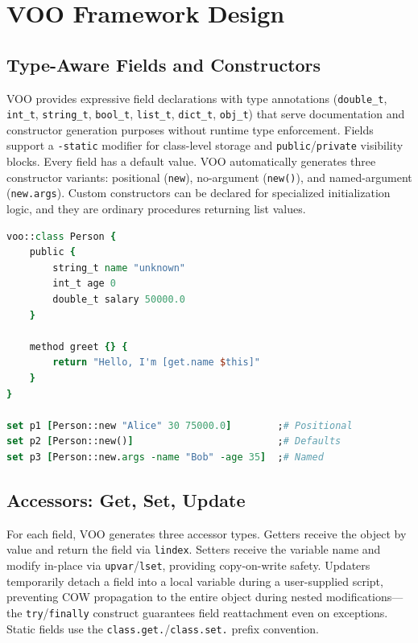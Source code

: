 \section{VOO Framework Design}

\subsection{Type-Aware Fields and Constructors}

VOO provides expressive field declarations with type annotations (\texttt{double\_t},
\texttt{int\_t}, \texttt{string\_t}, \texttt{bool\_t}, \texttt{list\_t}, \texttt{dict\_t},
\texttt{obj\_t}) that serve documentation and constructor generation purposes without
runtime type enforcement. Fields support a \texttt{-static} modifier for class-level
storage and \texttt{public}/\texttt{private} visibility blocks. Every field has a default
value. VOO automatically generates three constructor variants: positional (\texttt{new}),
no-argument (\texttt{new()}), and named-argument (\texttt{new.args}). Custom constructors
can be declared for specialized initialization logic, and they are ordinary procedures
returning list values.

\begin{lstlisting}[language=Tcl, caption={VOO class declaration with multiple constructor variants}]
voo::class Person {
    public {
        string_t name "unknown"
        int_t age 0
        double_t salary 50000.0
    }

    method greet {} {
        return "Hello, I'm [get.name $this]"
    }
}

set p1 [Person::new "Alice" 30 75000.0]        ;# Positional
set p2 [Person::new()]                         ;# Defaults
set p3 [Person::new.args -name "Bob" -age 35]  ;# Named
\end{lstlisting}

\subsection{Accessors: Get, Set, Update}

For each field, VOO generates three accessor types. Getters receive the object by value
and return the field via \texttt{lindex}. Setters receive the variable name and modify
in-place via \texttt{upvar}/\texttt{lset}, providing copy-on-write safety. Updaters
temporarily detach a field into a local variable during a user-supplied script, preventing
COW propagation to the entire object during nested modifications---the
\texttt{try}/\texttt{finally} construct guarantees field reattachment even on exceptions.
Static fields use the \texttt{class.get.}/\texttt{class.set.} prefix convention.

